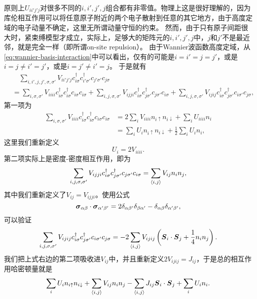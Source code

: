 原则上$U_{i i' j' j}$对很多不同的$i, i', j', j$组合都有非零值。物理上这是很好理解的，因为库伦相互作用可以将任意原子附近的两个电子散射到任意的其它地方，由于高度定域的电子动量不确定，这里无所谓动量守恒的约束。
然而，由于只有原子间距很大时，紧束缚模型才成立，实际上，足够大的矩阵元的$i, i', j', j$中，$j$和$j'$不是最近邻，就是完全一样（即所谓on-site repulsion）。
由于Wannier波函数高度定域，从\eqref{eq:wannier-basis-interaction}中可以看出，仅有的可能是$i=i'=j=j'$，或是$i=j \neq i'=j'$，或是$i=j' \neq i' = j$。
于是就有
\[
    \begin{aligned}
        &\quad \sum_{i, i', j, j', \sigma, \sigma'} V_{i i' j' j} c^\dagger_{i \sigma} c^\dagger_{i' \sigma'} c_{j' \sigma'} c_{j \sigma} \\
        &= \sum_{i, \sigma, \sigma'} V_{iiii} c^\dagger_{i \sigma} c^\dagger_{i \sigma} c_{i \sigma} c_{i \sigma} 
        + \sum_{i, j, \sigma, \sigma'} V_{i j j i} c^\dagger_{i \sigma} c^\dagger_{j \sigma'} c_{j \sigma'} c_{i \sigma}
        + \sum_{i, j, \sigma, \sigma'} V_{i j i j} c^\dagger_{i \sigma} c^\dagger_{j \sigma'} c_{i \sigma'} c_{j \sigma},
    \end{aligned}
\]
第一项为
\[
    \begin{aligned}
        \sum_{i, \sigma, \sigma'} V_{iiii} c^\dagger_{i \sigma} c^\dagger_{i \sigma} c_{i \sigma} c_{i \sigma} &= 2 \sum_{i} V_{iiii} n_{i \uparrow} n_{i \downarrow} + \sum_{i} U_{iiii} n_i \\
        &= \sum_{i} U_i n_{i \uparrow} n_{i \downarrow} + \frac{1}{2} \sum_{i} U_{i} n_i,
    \end{aligned}
\]
这里我们重新定义
\begin{equation}
    U_i = 2 V_{iiii}.
\end{equation}
第二项实际上是密度-密度相互作用，即为
\[
    \sum_{i, j, \sigma, \sigma'} V_{i j j i} c^\dagger_{i \sigma} c^\dagger_{j \sigma'} c_{j \sigma'} c_{i \sigma} = \sum_{\langle i, j \rangle} V_{ij} n_i n_j,
\]
其中我们重新定义了$V_{ij} = V_{ijji}$。使用公式
\[
    \vb*{\sigma}_{\alpha \beta} \cdot \vb*{\sigma}_{\alpha' \beta'} = 2 \delta_{\alpha \beta'} \delta_{\beta \alpha'} - \delta_{\alpha \beta} \delta_{\alpha' \beta'},
\]
可以验证
\[
    \sum_{i, j, \sigma, \sigma'} V_{i j i j} c^\dagger_{i \sigma} c^\dagger_{j \sigma'} c_{i \sigma'} c_{j \sigma} = - 2 \sum_{\langle i, j \rangle} V_{i j i j} \left( \vb*{S}_{i} \cdot \vb*{S}_j + \frac{1}{4} n_i n_j \right).
\]
我们把上式右边的第二项吸收进$V_{ij}$中，并且重新定义$2V_{ijij}=J_{ij}$，于是总的相互作用哈密顿量就是
\[
    \sum_{i} U_i n_{i \uparrow} n_{i \downarrow} + \sum_{\langle i, j \rangle} V_{ij} n_i n_j - \sum_{\langle i, j \rangle} J_{i j} \vb*{S}_{i} \cdot \vb*{S}_j + \sum_{i} U_i n_i.
\]
